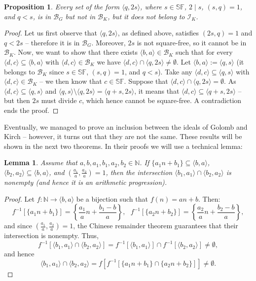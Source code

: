 \documentclass{amsart}
\newtheorem{lem}[thm]{Lemma}
\newtheorem{prop}[thm]{Proposition}
\theoremstyle{definition}
\newcommand{\N}{{\mathbb N}}
\newcommand{\I}{\mathcal I}
\newcommand{\B}{\mathcal{B}}
\newcommand{\SqrFr}{\mathbb{SF}}
\newcommand{\arithseq}[2]{\langle#2, #1\rangle}
\begin{document}
\begin{prop}
Every set of the form $\arithseq{2s}{q}$, where $s \in\SqrFr$, $2\mid s$, $(s,q)=1$, and $q<s$, is in $\B_G$ but not in $\B_K$, but it does not belong to $\I_K$.
\end{prop}

\begin{proof}
Let us first observe that $\arithseq{2s}{q}$, as defined above, satisfies $(2s,q)=1$ and $q<2s$ -- therefore it is in $\B_G$. Moreover, $2s$ is not square-free, so it cannot be in $\B_K$.
Now, we want to show that there exists $\arithseq{a}{b}\in \B_K$ such that for every $\arithseq{c}{d}\subseteq \arithseq{a}{b}$ with $\arithseq{c}{d}\in \B_K$ we have $\arithseq{c}{d}\cap \arithseq{2s}{q} \neq \emptyset$. Let $\arithseq{a}{b} := \arithseq{s}{q}$ (it belongs to $\B_K$ since $s\in\SqrFr$, $(s,q)=1$, and $q<s$). Take any $\arithseq{c}{d}\subseteq \arithseq{s}{q}$ with $\arithseq{c}{d}\in \B_K$ -- we then know that $c\in\SqrFr$. Suppose that $\arithseq{c}{d}\cap \arithseq{2s}{q} = \emptyset$. As $\arithseq{c}{d}\subseteq \arithseq{s}{q}$ and $\arithseq{s}{q} \setminus \arithseq{2s}{q} = \arithseq{2s}{q+s}$, it means that $\arithseq{c}{d}\subseteq \arithseq{2s}{q+s}$ -- but then $2s$ must divide $c$, which hence cannot be square-free. A contradiction ends the proof.
\end{proof}

Eventually, we managed to prove an inclusion between the ideals of Golomb and Kirch -- however, it turns out that they are not the same. These results will be shown in the next two theorems. In their proofs we will use a technical lemma:
 
\begin{lem} \label{lemCRT}
Assume that $a,b,a_1,b_1,a_2,b_2 \in\N$. If $\{a_1 n+b_1\}\subseteq \arithseq{a}{b}$, $\arithseq{a_2}{b_2}\subseteq \arithseq{a}{b}$, and $\left(\frac{a_1}{a},\frac{a_2}{a}\right)=1$, then the intersection $\arithseq{a_1}{b_1}\cap\arithseq{a_2}{b_2}$ is nonempty (and hence it is an arithmetic progression). 
\end{lem}

\begin{proof}
Let $f\colon\N\to \arithseq{a}{b}$ be a bijection such that $f(n) = an+b$. Then: 
$$f^{-1}[\{a_1 n+b_1\}] = \left\{\frac{a_1}{a} n+\frac{b_1-b}{a}\right\},\ \ \ f^{-1}[\{a_2 n+b_2\}] = \left\{\frac{a_2}{a} n+\frac{b_2-b}{a}\right\},$$
and since $\left(\frac{a_1}{a},\frac{a_2}{a}\right)=1$, the Chinese remainder theorem guarantees that their intersection is nonempty. Thus,
$$f^{-1}[\arithseq{a_1}{b_1}\cap\arithseq{a_2}{b_2}] = f^{-1}[\arithseq{a_1}{b_1}]\cap f^{-1}[\arithseq{a_2}{b_2}]\neq\emptyset,$$
and hence
$$\arithseq{a_1}{b_1}\cap\arithseq{a_2}{b_2} = f[f^{-1}[\{a_1 n+b_1\}\cap\{a_2 n+b_2\}]] \neq\emptyset.$$
\end{proof}
\end{document}
